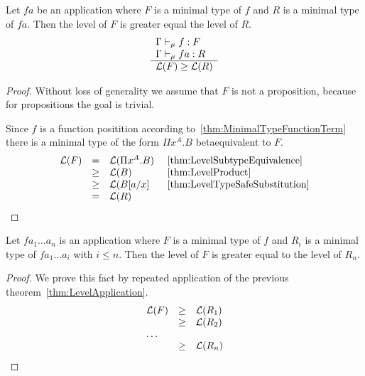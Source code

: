 \begin{theorem}
    \label{thm:LevelApplication}
    Let $f a$ be an application where $F$ is a minimal type of $f$ and $R$ is a
    minimal type of $f a$. Then the level of $F$ is greater equal the level of
    $R$.
    $$
    \begin{array}{l} 
        \Gamma \vdash_\mu f : F
        \\
        \Gamma \vdash_\mu f a: R
     \\ \hline 
        {\cal L}(F) \ge {\cal L}(R)
    \end{array}
    $$
    \begin{proof}
        Without loss of generality we assume that $F$ is not a proposition,
        because for propositions the goal is trivial.

        Since $f$ is a function positition according
        to~\ref{thm:MinimalTypeFunctionTerm} there is a minimal type of the form
        $\Pi x^A.B$ betaequivalent to $F$.
        $$
        \begin{array}{lllll}
            {\cal L}(F)
            & = & {\cal L}(\Pi x^A.B) &~\ref{thm:LevelSubtypeEquivalence}
            \\
            & \ge  & {\cal L}(B)
            &~\ref{thm:LevelProduct}
            \\
            & \ge & {\cal L}(B[a/x]
            &~\ref{thm:LevelTypeSafeSubstitution}
            \\
            & = & {\cal L}(R)
        \end{array}
        $$
    \end{proof}
\end{theorem}


\begin{theorem}
    \label{thm:LevelRepeatedApplication}
    Let $f a_1 \ldots a_n$ is an application where $F$ is a minimal type of $f$
    and $R_i$ is a minimal type of $f a_1 \ldots a_i$ with $i \le n$. Then the
    level of $F$ is greater equal to the level of $R_n$.

    \begin{proof}
        We prove this fact by repeated application of the previous
        theorem~\ref{thm:LevelApplication}.
        $$
        \begin{array}{lll}
            {\cal L}(F) & \ge & {\cal L}(R_1)
            \\
            & \ge & {\cal L}(R_2)
            \\
            \ldots
            \\
            & \ge & {\cal L}(R_n)
        \end{array}
        $$
    \end{proof}
\end{theorem}








